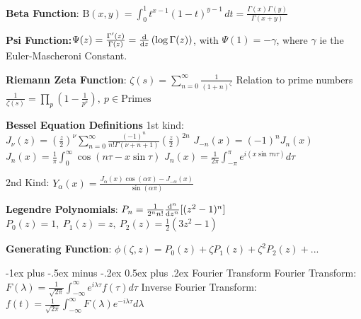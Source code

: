 \documentclass{article}
\makeatletter
\theoremstyle{definition}
\renewcommand{\section}{\@startsection{section}{1}{0mm}%
	{-1ex plus -.5ex minus -.2ex}%
	{0.5ex plus .2ex}%
	{\normalfont\large\bfseries}}
\makeatother
\begin{document}
\begin{multicols}{3}
\textbf{Beta Function}: $ \mathrm{B} (x,y)=\int _{0}^{1}t^{x-1}(1-t)^{y-1}\,dt
= \frac{\Gamma(x)\Gamma(y)}{\Gamma(x+y)}$

\textbf{Psi Function:}$\Psi (z) = \frac{\Gamma'(z)}{\Gamma(z)} = \dv{z} \left(\log \Gamma(z)\right)$, with $\Psi(1) = -\gamma$, where $\gamma$ ie the Euler-Mascheroni Constant. 

\textbf{Riemann Zeta Function}: 
$\zeta(s) = \sum_{n=0}^{\infty} \frac{1}{(1+n)^\zeta}$
Relation to prime numbers
$\frac{1}{\zeta(s)} = \prod_{p} (1-\frac{1}{p^s}),\ p \in \text{Primes}$

\textbf{Bessel Equation Definitions}
1st kind: $J_\nu (z) = \left(\frac{z}{2}\right)^\nu \sum_{n=0}^{\infty} \frac{(-1)^n}{n! \Gamma(\nu+n+1)} \left(\frac{z}{2}\right)^{2n}$
$J_{-n}(x) = (-1)^nJ_n(x)$
$J_n(x) = \frac{1}{\pi} \int_0^\infty \cos(n\tau - x \sin\tau)$
$J_n(x) = \frac{1}{2\pi} \int_{-\pi}^{\pi} e^{i(x\sin\tau n\tau)} d\tau $

2nd Kind: $Y_{\alpha }(x)={\frac {J_{\alpha }(x)\cos(\alpha \pi )-J_{-\alpha }(x)}{\sin(\alpha \pi )}}$

\textbf{Legendre Polynomials}:
$P_n = \frac{1}{2^n n!} \dv{^n}{z^n} [(z^2-1)^n]$
$P_0(z) = 1,\ 
P_1(z) = z,\ 
P_2(z)= \frac{1}{2}(3z^2-1) 
$

\textbf{Generating Function}: $\phi(\zeta, z) = P_0(z) + \zeta P_1(z) + \zeta^2 P_2(z) + ...$


\section{Fourier Transform}
Fourier Transform:$F(\lambda) = \frac{1}{\sqrt{2\pi}} \int_{-\infty}^{\infty} e^{i \lambda \tau} f(\tau) d\tau$
Inverse Fourier Transform: 
$f(t) = \frac{1}{\sqrt{2\pi}} \int_{-\infty}^\infty F(\lambda) e^{-i\lambda \tau} d\lambda $

\end{multicols}
\end{document}
